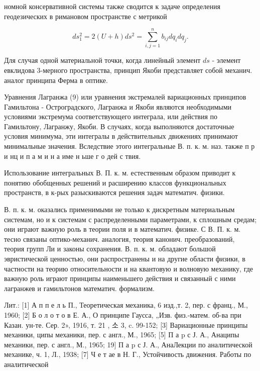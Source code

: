 \documentclass[10pt]{article}
\begin{document}
номной консервативной системы также сводится к задаче определения геодезических в римановом пространстве с метрикой



\[

d s_{1}^{2}=2(U+h) d s^{2}=\sum_{i, j=1}^{n} b_{i j} d q_{i} d q_{j} .

\]



Для случая одной материальной точки, когда линейный элемент $d s$ - элемент евклидова 3-мерного пространства, принцип Якоби представляет собой механич. аналог принципа Ферма в оптике.



Уравнения Лагранжа (9) или уравнения экстремалей вариационных принципов Гамильтона - Остроградского, Лагранжа и Якоби являются необходимыми условиями экстремума соответствующего интеграла, или действия по Гамильтону, Лагранжу, Якоби. В случаях, когда выполняются достаточные условия минимума, эти интегралы в действительных движениях принимают минимальные значения. Вследствие этого интегральные В. п. к. м. наз. также п р и нц и п а м и н а име н ьше г о дей с твия.



Использование интегральных В. П. к. м. естественным образом приводит к понятию обобщенных решений и расширению классов функциональных пространств, в к-рых разыскиваются решения задач математич. физики.



В. п. к. м. оказались применимыми не только к дискретным материальным системам, но и к системам с распределенными параметрами, к сплошным средам; они играют важную роль в теории поля и в математич. физике. С В. П. к. м. тесно связаны оптико-механич. аналогия, теория канонич. преобразований, теория групп Ли и законы сохранения. В. п. к. м. обладают большой эвристической ценностью, они распространены и на другие области физики, в частности на теорию относительности и на квантовую и волновую механику, где важную роль играют принципы наименьшего действия и связанный с ними лагранжев и гамильтонов математич. формализм.



Лит.: [1] А п п е л ь П., Теоретическая механика, 6 изд.,т. 2, пер. с франц., М., 1960; [2] Б о л о т о в Е. А., О принципе Гаусса, „Изв. физ.-матем. об-ва при Казан. ун-те. Сер. 2», 1916, т. 21 , 소 3, c. 99-152; [3] Вариационные принципы механики, ципы механики, пер. с англ., М., 1965; [5] П а p с Ј. А., Анаципы механики, пер. с англ., М., 1965; 19] П а p с Ј. А., АнаЛекции по аналитической механике, ч. 1, Л., 1938; [7] Ч е т ае в Н. Г., Устойчивость движения. Работы по аналитической
\end{document}
